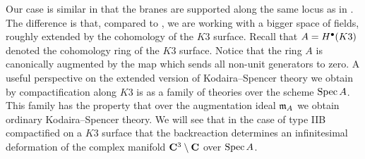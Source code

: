 \documentclass[../main.tex]{subfiles}
\begin{document}
Our case is similar in that the branes are supported along the same locus as in \cite{CostelloGaiotto, CP}.
The difference is that, compared to \cite{CostelloGaiotto}, we are working with a bigger space of fields, roughly extended by the cohomology of the $K3$ surface.
Recall that $A = H^{\bullet}(K3)$ denoted the cohomology ring of the $K3$ surface.
Notice that the ring $A$ is canonically augmented by the map which sends all non-unit generators to zero. %
A useful perspective on the extended version of Kodaira--Spencer theory we obtain by compactification along $K3$ is as a family of theories over the scheme $\operatorname{Spec} A$.
This family has the property that over the augmentation ideal $\mathfrak{m}_A$ we obtain ordinary Kodaira--Spencer theory.
We will see that in the case of type IIB compactified on a $K3$ surface that the backreaction determines an infinitesimal deformation of the complex manifold $\mathbf{C}^3 \setminus \mathbf{C}$ over $\operatorname{Spec} A$. 
 
\end{document}

